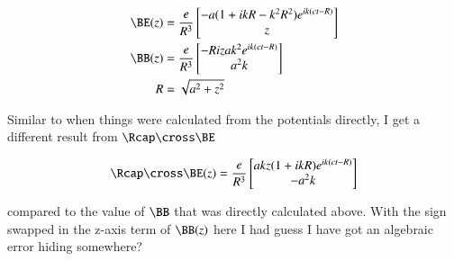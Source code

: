 {\begin{equation}\label{eqn:relativisticElectrodynamicsExamReflection:1020}
\begin{aligned}
\BE(z)
&=
\frac{e}{R^3}
\begin{bmatrix}
- a (1 + i k R - k^2 R^2 ) e^{i k (c t - R)} \\
z
\end{bmatrix} \\
\BB(z)
&=
\frac{e}{R^3}
\begin{bmatrix}
-R i z a k^2 e^{i k (c t - R)} \\
a^2 k
\end{bmatrix} \\
R &= \sqrt{a^2 + z^2}
\end{aligned}
\end{equation}

Similar to when things were calculated from the potentials directly, I get a different result from \(\Rcap \cross \BE\)

\begin{equation}\label{eqn:relativisticElectrodynamicsExamReflection:1030}
\Rcap \cross \BE(z) = \frac{e}{R^3}
\begin{bmatrix}
a k z (1 + i k R) e^{i k (c t - R)} \\
-a^2 k
\end{bmatrix}
\end{equation}

compared to the value of \(\BB\) that was directly calculated above.  With the sign swapped in the z-axis term of \(\BB(z)\) here I had guess I have got an algebraic error hiding somewhere?

} %

